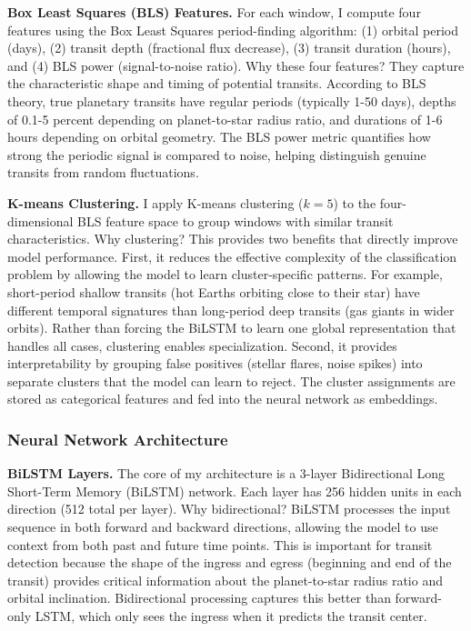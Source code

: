 \documentclass[letterpaper]{article} %
\begin{document}
\textbf{Box Least Squares (BLS) Features.} For each window, I compute four features using the Box Least Squares period-finding algorithm: (1) orbital period (days), (2) transit depth (fractional flux decrease), (3) transit duration (hours), and (4) BLS power (signal-to-noise ratio). Why these four features? They capture the characteristic shape and timing of potential transits. According to BLS theory, true planetary transits have regular periods (typically 1-50 days), depths of 0.1-5 percent depending on planet-to-star radius ratio, and durations of 1-6 hours depending on orbital geometry. The BLS power metric quantifies how strong the periodic signal is compared to noise, helping distinguish genuine transits from random fluctuations.

\textbf{K-means Clustering.} I apply K-means clustering ($k=5$) to the four-dimensional BLS feature space to group windows with similar transit characteristics. Why clustering? This provides two benefits that directly improve model performance. First, it reduces the effective complexity of the classification problem by allowing the model to learn cluster-specific patterns. For example, short-period shallow transits (hot Earths orbiting close to their star) have different temporal signatures than long-period deep transits (gas giants in wider orbits). Rather than forcing the BiLSTM to learn one global representation that handles all cases, clustering enables specialization. Second, it provides interpretability by grouping false positives (stellar flares, noise spikes) into separate clusters that the model can learn to reject. The cluster assignments are stored as categorical features and fed into the neural network as embeddings.

\subsubsection{Neural Network Architecture}

\textbf{BiLSTM Layers.} The core of my architecture is a 3-layer Bidirectional Long Short-Term Memory (BiLSTM) network. Each layer has 256 hidden units in each direction (512 total per layer). Why bidirectional? BiLSTM processes the input sequence in both forward and backward directions, allowing the model to use context from both past and future time points. This is important for transit detection because the shape of the ingress and egress (beginning and end of the transit) provides critical information about the planet-to-star radius ratio and orbital inclination. Bidirectional processing captures this better than forward-only LSTM, which only sees the ingress when it predicts the transit center.
\end{document}
